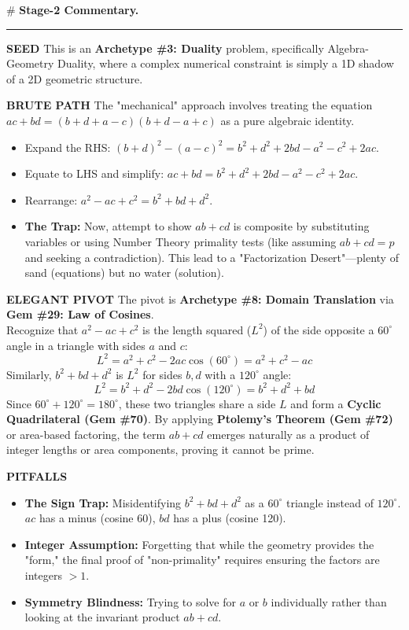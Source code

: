 \documentclass{article}
\begin{document}
\noindent \# \textbf{Stage-2 Commentary.} \\
\noindent \rule{\textwidth}{0.4pt}

\noindent \textbf{SEED}
This is an \textbf{Archetype \#3: Duality} problem, specifically Algebra-Geometry Duality, where a complex numerical constraint is simply a 1D shadow of a 2D geometric structure.

\noindent \textbf{BRUTE PATH}
The "mechanical" approach involves treating the equation $ac + bd = (b + d + a - c)(b + d - a + c)$ as a pure algebraic identity.
\begin{itemize}
    \item Expand the RHS: $(b + d)^2 - (a - c)^2 = b^2 + d^2 + 2bd - a^2 - c^2 + 2ac$.
    \item Equate to LHS and simplify: $ac + bd = b^2 + d^2 + 2bd - a^2 - c^2 + 2ac$.
    \item Rearrange: $a^2 - ac + c^2 = b^2 + bd + d^2$.
    \item \textbf{The Trap:} Now, attempt to show $ab + cd$ is composite by substituting variables or using Number Theory primality tests (like assuming $ab + cd = p$ and seeking a contradiction). This lead to a "Factorization Desert"—plenty of sand (equations) but no water (solution).
\end{itemize}

\noindent \textbf{ELEGANT PIVOT}
The pivot is \textbf{Archetype \#8: Domain Translation} via \textbf{Gem \#29: Law of Cosines}. \\
Recognize that $a^2 - ac + c^2$ is the length squared ($L^2$) of the side opposite a $60^\circ$ angle in a triangle with sides $a$ and $c$:
\begin{equation*}
    L^2 = a^2 + c^2 - 2ac \cos(60^\circ) = a^2 + c^2 - ac
\end{equation*}
Similarly, $b^2 + bd + d^2$ is $L^2$ for sides $b, d$ with a $120^\circ$ angle:
\begin{equation*}
    L^2 = b^2 + d^2 - 2bd \cos(120^\circ) = b^2 + d^2 + bd
\end{equation*}
Since $60^\circ + 120^\circ = 180^\circ$, these two triangles share a side $L$ and form a \textbf{Cyclic Quadrilateral (Gem \#70)}. By applying \textbf{Ptolemy’s Theorem (Gem \#72)} or area-based factoring, the term $ab + cd$ emerges naturally as a product of integer lengths or area components, proving it cannot be prime.

\noindent \textbf{PITFALLS}
\begin{itemize}
    \item \textbf{The Sign Trap:} Misidentifying $b^2 + bd + d^2$ as a $60^\circ$ triangle instead of $120^\circ$. $ac$ has a minus (cosine 60), $bd$ has a plus (cosine 120).
    \item \textbf{Integer Assumption:} Forgetting that while the geometry provides the "form," the final proof of "non-primality" requires ensuring the factors are integers $> 1$.
    \item \textbf{Symmetry Blindness:} Trying to solve for $a$ or $b$ individually rather than looking at the invariant product $ab + cd$.
\end{itemize}
\end{document}
